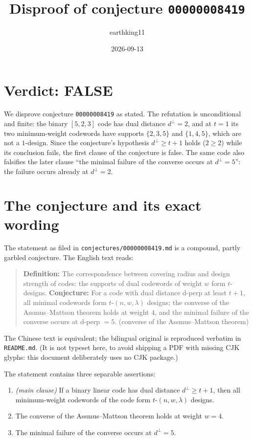 \documentclass[11pt]{article}
\title{Disproof of conjecture \texttt{00000008419}}
\author{earthking11}
\date{2026-09-13}
\theoremstyle{definition}
\theoremstyle{remark}
\newcommand{\dperp}{d^{\perp}}
\begin{document}
\maketitle

\section*{Verdict: FALSE}

We disprove conjecture \texttt{00000008419} as stated. The refutation is
unconditional and finite: the binary $[5,2,3]$ code has dual distance
$\dperp = 2$, and at $t = 1$ its two minimum-weight codewords have supports
$\{2,3,5\}$ and $\{1,4,5\}$, which are not a $1$-design. Since the
conjecture's hypothesis $\dperp \ge t+1$ holds ($2 \ge 2$) while its conclusion
fails, the first clause of the conjecture is false. The same code also
falsifies the later clause ``the minimal failure of the converse occurs at
$\dperp = 5$'': the failure occurs already at $\dperp = 2$.

\section{The conjecture and its exact wording}

The statement as filed in \texttt{conjectures/00000008419.md} is a compound,
partly garbled conjecture. The English text reads:

\begin{quote}
\textbf{Definition:} The correspondence between covering radius and design
strength of codes: the supports of dual codewords of weight $w$ form
$t$-designs. \textbf{Conjecture:} For a code with dual distance d-perp at least
$t+1$, all minimal codewords form $t$-$(n,w,\lambda)$ designs; the converse of
the Assmus--Mattson theorem holds at weight $4$, and the minimal failure of the
converse occurs at d-perp $= 5$. (converse of the Assmus--Mattson theorem)
\end{quote}

The Chinese text is equivalent; the bilingual original is reproduced verbatim
in \texttt{README.md}. (It is not typeset here, to avoid shipping a PDF with
missing CJK glyphs: this document deliberately uses no CJK package.)

The statement contains three separable assertions:

\begin{enumerate}
\item[(C1)] \emph{(main clause)} If a binary linear code has dual distance
      $\dperp \ge t+1$, then all minimum-weight codewords of the code form
      $t$-$(n,w,\lambda)$ designs.
\item[(C2)] The converse of the Assmus--Mattson theorem holds at weight $w=4$.
\item[(C3)] The minimal failure of the converse occurs at $\dperp = 5$.
\end{enumerate}
\end{document}
